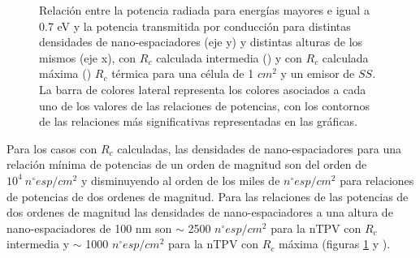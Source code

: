 \begin{figure}[H]
	\caption[Relación entre la potencia radiada para energías mayores e igual a 0.7 eV y la potencia transmitida por conducción para distintas densidades de nano-espaciadores (eje y) y distintas alturas de los mismos (eje x), con $R_c$ calculada intermedia () y con $R_c$ calculada máxima () $R_c$ térmica para una célula de 1 $cm^2$ y un emisor de $SS$. La barra de colores lateral representa los colores asociados a cada uno de los valores de las relaciones de potencias, con los contornos de las relaciones más significativas representadas en las gráficas.]{\small Relación entre la potencia radiada para energías mayores e igual a 0.7 eV y la potencia transmitida por conducción para distintas densidades de nano-espaciadores (eje y) y distintas alturas de los mismos (eje x), con $R_c$ calculada intermedia () y con $R_c$ calculada máxima () $R_c$ térmica para una célula de 1 $cm^2$ y un emisor de $SS$. La barra de colores lateral representa los colores asociados a cada uno de los valores de las relaciones de potencias, con los contornos de las relaciones más significativas representadas en las gráficas.
}
	\label{fig:rels_SsSiO2Ge_Prc1vsPrc2}
\end{figure}
Para los casos con $R_c$ calculadas, las densidades de nano-espaciadores para una relación mínima de potencias de un orden de magnitud son del orden de $10^4 \ n^{\circ}esp/cm^2$ y disminuyendo al orden de los miles de $n^{\circ}esp/cm^2$ para relaciones de potencias de dos ordenes de magnitud. Para las relaciones de las potencias de dos ordenes de magnitud las densidades de nano-espaciadores a una altura de nano-espaciadores de 100 nm son $\sim$ 2500 $n^{\circ} esp/cm^2$ para la nTPV con $R_c$ intermedia y $\sim$ 1000 $n^{\circ} esp/cm^2$ para la nTPV con $R_c$ máxima (figuras \ref{fig:rels_SsSiO2Ge_Prc1vsPrc2}  y ).\\\\
